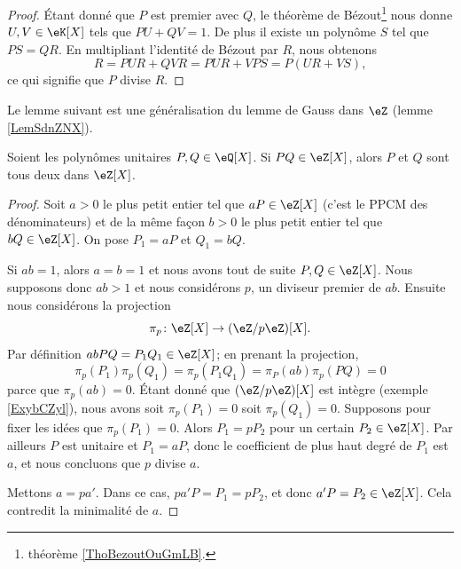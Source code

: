 \begin{proof}
    Étant donné que \( P\) est premier avec \( Q\), le théorème de Bézout\footnote{théorème \ref{ThoBezoutOuGmLB}.} nous donne \( U,V\in \eK[X]\) tels que \( PU+QV=1\). De plus il existe un polynôme \( S\) tel que \( PS=QR\). En multipliant l'identité de Bézout par \( R\), nous obtenons
    \begin{equation}
        R=PUR+QVR=PUR+VPS=P(UR+VS),
    \end{equation}
    ce qui signifie que \( P\) divise \( R\).
\end{proof}

Le lemme suivant est une généralisation du lemme de Gauss dans \( \eZ\) (lemme \ref{LemSdnZNX}).
\begin{lemma}       \label{LemEfdkZw}   
    Soient les polynômes unitaires \( P,Q\in \eQ[X]\). Si \( PQ\in\eZ[X]\), alors \( P\) et \( Q\) sont tous deux dans \( \eZ[X]\).
\end{lemma}

\begin{proof}
    Soit \( a>0\) le plus petit entier tel que \( aP\in\eZ[X]\) (c'est le PPCM des dénominateurs) et de la même façon \( b>0\) le plus petit entier tel que \( bQ\in \eZ[X]\). On pose \( P_1=aP\) et \( Q_1=bQ\).

    Si \( ab=1\), alors \( a=b=1\) et nous avons tout de suite \( P,Q\in \eZ[X]\). Nous supposons donc \( ab>1\) et nous considérons \( p\), un diviseur premier de \( ab\). Ensuite nous considérons la projection
    \begin{equation}
        \pi_p\colon \eZ[X]\to (\eZ/p\eZ)[X].
    \end{equation}
    Par définition \( abPQ=P_1Q_1\in \eZ[X]\); en prenant la projection,
    \begin{equation}
        \pi_p(P_1)\pi_p(Q_1)=\pi_p(P_1Q_1)=\pi_P(ab)\pi_p(PQ)=0
    \end{equation}
    parce que \( \pi_p(ab)=0\). Étant donné que \( (\eZ/p\eZ)[X]\) est intègre (exemple \ref{ExybCZyl}), nous avons soit \( \pi_p(P_1)=0\) soit \( \pi_p(Q_1)=0\). Supposons pour fixer les idées que \( \pi_p(P_1)=0\). Alors \( P_1=pP_2\) pour un certain \( P_2\in \eZ[X]\). Par ailleurs \( P\) est unitaire et \( P_1=aP\), donc le coefficient de plus haut degré de \( P_1\) est \( a\), et nous concluons que \( p\) divise \( a\).
    
    Mettons \( a=pa'\). Dans ce cas, \( pa'P=P_1=pP_2\), et donc \( a'P=P_2\in \eZ[X]\). Cela contredit la minimalité de \( a\).
\end{proof}


